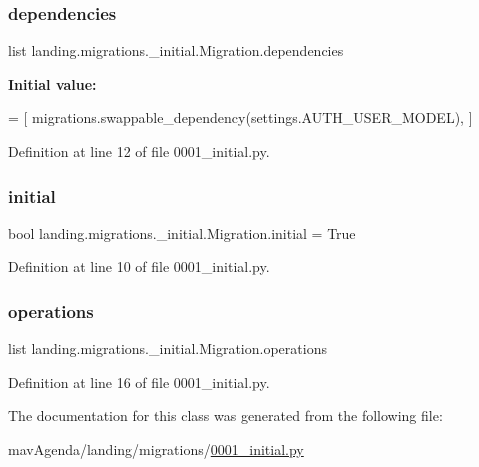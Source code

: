 \subsubsection{\texorpdfstring{dependencies}{dependencies}}
{\footnotesize\ttfamily list landing.\+migrations.\+\_\+initial.\+Migration.\+dependencies\hspace{0.3cm}{\ttfamily [static]}}

{\bfseries Initial value\+:}
\begin{DoxyCode}
=  [
        migrations.swappable\_dependency(settings.AUTH\_USER\_MODEL),
    ]
\end{DoxyCode}


Definition at line 12 of file 0001\+\_\+initial.\+py.

\mbox{\label{classlanding_1_1migrations_1_10001__initial_1_1Migration_a4de7b3a61ec6f60906e74358f823c43c}} 
\subsubsection{\texorpdfstring{initial}{initial}}
{\footnotesize\ttfamily bool landing.\+migrations.\+\_\+initial.\+Migration.\+initial = True\hspace{0.3cm}{\ttfamily [static]}}



Definition at line 10 of file 0001\+\_\+initial.\+py.

\mbox{\label{classlanding_1_1migrations_1_10001__initial_1_1Migration_abbd7e42fa7ac2174a9fc7593b13b3f23}} 
\subsubsection{\texorpdfstring{operations}{operations}}
{\footnotesize\ttfamily list landing.\+migrations.\+\_\+initial.\+Migration.\+operations\hspace{0.3cm}{\ttfamily [static]}}



Definition at line 16 of file 0001\+\_\+initial.\+py.



The documentation for this class was generated from the following file\+:\begin{DoxyCompactItemize}
\item 
mav\+Agenda/landing/migrations/\mbox{\hyperlink{0001__initial_8py}{0001\+\_\+initial.\+py}}\end{DoxyCompactItemize}
